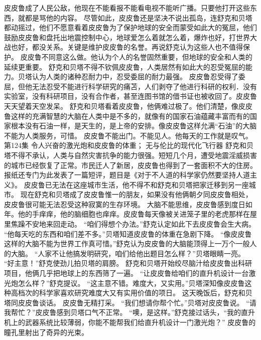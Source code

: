 \documentclass[a4paper,12pt,UTF8,twoside]{ctexbook}
\begin{document}
        皮皮鲁成了人民公敌，他现在不能看报不能看电视不能听广播。只要他打开这些东西，就都是骂他的内容。 
        尽管如此，皮皮鲁还是坚决不说出孤岛，连舒克和贝塔都动摇过，他们不愿意看着皮皮鲁为了保护地球的安全而蒙受如此大的冤屈，他们鼓励皮皮鲁和盘托出地震控制中心，地球爱怎么着就怎么着，爆炸也好，打世界大战也好，都没关系。关键是维护皮皮鲁的名誉。再说舒克认为这些人也不值得保护。 
        皮皮鲁不同意这么做。他认为个人的名誉固然重要，但地球的安全和人类的延续更重要。 
        舒克和贝塔不得不钦佩皮皮鲁，人类居然有如此大的忍受冤屈的能力。贝塔认为人类的诸种忍耐力中，忍受委屈的耐力最强。 
        皮皮鲁忍受得了委屈，但他无法忍受不能进行科学研究的痛苫，人们剥夺了他进行科研的权利．没有实验室，没有科研项目，没有合作者，甚至连图书馆的借书证也被收回了。皮皮鲁天天望着天空发呆。 
        舒克和贝塔看着皮皮鲁，他俩难过极了。他们清楚，像皮皮鲁这样的充满智慧的大脑在人类中是不多的，就像有的国家石油蕴藏丰富而有的国家根本没有石油一样，是天生的，是上帝的安排。像皮皮鲁这样允满“石油”的大脑不能为人类服务，可惜。 
        皮皮鲁不能出门。不能见人。他每天的工作就是叹气。   第124集 
        令人兴奋的激光炮和皮皮鲁的体重； 
        无与伦比的现代化飞行器   
        舒克和贝塔不得不承认，人类与自然灾害抗争的能力很强。短短几个月，遭受地震淫威损害的城市已经恢复了正常。市民迁人了新居，皮皮鲁也得到了一套面积不大的住房。报纸还专门为此发表了一篇短评，题目是《对于不人道的科学家仍然要坚持人道主义》。 
        皮皮鲁已无法在这座城市生活，他不得不和舒克和贝塔把家迁移到另一座城市。 
        现在舒克和贝塔成了皮皮鲁惟一的朋友，如果没有他俩朝夕同皮皮鲁相处，皮皮鲁很可能无法忍受这种寂寞的生存环境。 
        大脑不能思维，皮皮鲁感到度日如年。他的手痒痒，他的脑细胞也痒痒。皮皮鲁每天像被关进笼子里的老虎那样在屋里焦躁不安地来回走动。 
        “咱们得想个办法。”舒克认定如此下去皮皮鲁会生大病。 
        “他每天吃的东西和咱们差不多。”贝塔知道皮皮鲁的体重在急剧下降。 
        “像皮皮鲁这样的大脑不能为世界工作真可惜。”舒克认为皮皮鲁的大脑能顶得上一万个一般人的大脑。 
        “人家不让他搞发明研究，咱们给他出题目怎么样？”贝塔眼睛一亮。 
        “好主意！”舒克使劲儿拍贝塔的肩膀。 
        舒克和贝塔开始绞尽脑汁给皮皮鲁出科研项目，他俩几乎把地球上的东西筛了一遍。 
        “让皮皮鲁给咱们的直升机设计一台激光炮怎么样？”舒克提议。 
        “这主意不错。难度大，又实用。”贝塔深知像皮皮鲁这种高档次的科学家喜欢研究难度大又有实用价值的项日。 
        这天晚饭后，舒克和贝塔同皮皮鲁谈话。 
        皮皮鲁无精打采。 
        “我们想请你帮个忙。”贝塔对皮皮鲁说。 
        “请我帮忙？”皮皮鲁感到贝塔口气不正常。 
        “噢，是这样。”舒克接过话头，“我的直升机上的武器系统比较薄弱，你能不能帮我们给直升机设计一门激光炮？” 
        皮皮鲁的瞳孔里射出了奇异的光束。 
\end{document}

